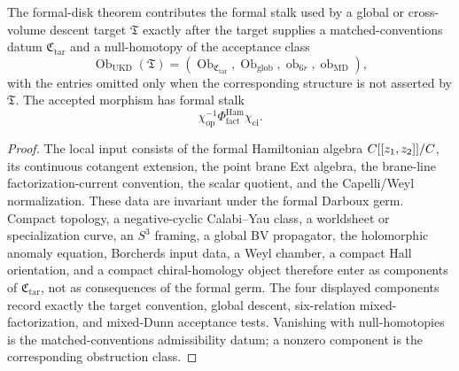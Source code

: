 \begin{lem}\label{lem:no-formal-disk-transfer}
  The formal-disk theorem contributes the formal stalk used by a global
  or cross-volume descent target \(\mathfrak T\) exactly after
  the target supplies a matched-conventions datum
  \(\mathfrak C_{\mathrm{tar}}\) and a null-homotopy of the acceptance
  class
  \[
  \operatorname{Ob}_{\mathrm{UKD}}(\mathfrak T)
  =
  \left(
    \operatorname{Ob}_{\mathfrak C_{\mathrm{tar}}},
    \operatorname{Ob}_{\mathrm{glob}},
    \operatorname{ob}_{6r},
    \operatorname{ob}_{\mathrm{MD}}
  \right),
  \]
  with the entries omitted only when the corresponding structure is not
  asserted by \(\mathfrak T\).  The accepted morphism has formal stalk
  \[
    \chi_{\mathrm{op}}^{-1}
    \Phi^{\mathrm{Ham}}_{\mathrm{fact}}
    \chi_{\mathrm{cl}}.
  \]
\end{lem}

\begin{proof}
  The local input consists of the formal Hamiltonian algebra
  \(C[[z_1,z_2]]/C\), its continuous cotangent extension, the point
  brane Ext algebra, the brane-line factorization-current convention,
  the scalar quotient, and the Capelli/Weyl normalization.  These data
  are invariant under the formal Darboux germ.  Compact topology, a
  negative-cyclic Calabi--Yau class, a worldsheet or specialization
  curve, an \(S^3\) framing, a global BV propagator, the holomorphic
  anomaly equation, Borcherds input data, a Weyl chamber, a compact Hall
  orientation, and a compact chiral-homology object therefore enter as
  components of \(\mathfrak C_{\mathrm{tar}}\), not as consequences of the
  formal germ.  The four displayed components record exactly the target
  convention, global descent, six-relation mixed-factorization, and
  mixed-Dunn acceptance tests.  Vanishing with null-homotopies is the
  matched-conventions admissibility datum; a nonzero component is the corresponding
  obstruction class.
\end{proof}

